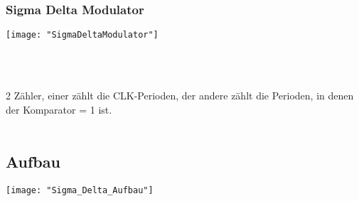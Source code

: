 \subsubsection{Sigma Delta Modulator}
\begin{minipage}[t]{0.3\textwidth}
	\vspace{0pt}
	\texttt{[image: "SigmaDeltaModulator"]}
\end{minipage}\hspace{0.05\textwidth}
\begin{minipage}[t]{0.3\textwidth}
	\vspace{0pt}
	\\
	\\
\end{minipage}\hspace{0.05\textwidth}
\begin{minipage}[t]{0.3\textwidth}
	\vspace{0pt}
	2 Zähler, einer zählt die CLK-Perioden, der andere zählt die Perioden, in denen der Komparator = 1 ist.\\
	\\
\end{minipage}
\vspace{2mm}



\subsection{Aufbau}
\begin{minipage}[t]{0.3\textwidth}
	\vspace{0pt}
	\texttt{[image: "Sigma\_Delta\_Aufbau"]}
\end{minipage}\hspace{0.05\textwidth}
\begin{minipage}[t]{0.3\textwidth}
	\vspace{0pt}
	
\end{minipage}\hspace{0.05\textwidth}
\begin{minipage}[t]{0.3\textwidth}
	\vspace{0pt}
	
\end{minipage}
\vspace{2mm}

